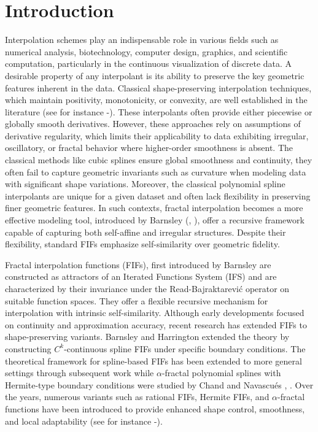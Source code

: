 \documentclass[runningheads]{llncs}
\begin{document}
	\section{Introduction}
	Interpolation schemes play an indispensable role in various fields such as numerical analysis, biotechnology, computer design, graphics, and scientific computation, particularly in the continuous visualization of discrete data. A desirable property of any interpolant is its ability to preserve the key geometric features inherent in the data. Classical shape-preserving interpolation techniques, which maintain positivity, monotonicity, or convexity, are well established in the literature (see for instance \cite{FT91}-\cite{HG1991}). These interpolants often provide either piecewise or globally smooth derivatives. However, these approaches rely on assumptions of derivative regularity, which limits their applicability to data exhibiting irregular, oscillatory, or fractal behavior where higher-order smoothness is absent. The classical methods like cubic splines ensure global smoothness and continuity, they often fail to capture geometric invariants such as curvature when modeling data with significant shape variations. Moreover, the classical polynomial spline interpolants are unique for a given dataset and often lack flexibility in preserving finer geometric features. In such contexts, fractal interpolation becomes a more effective modeling tool, introduced by Barnsley (\cite{Barnsley86}, \cite{Barnsley93}), offer a recursive framework capable of capturing both self-affine and irregular structures. Despite their flexibility, standard FIFs emphasize self-similarity over geometric fidelity.
	
	\par Fractal interpolation functions (FIFs), first introduced by Barnsley are constructed as attractors of an Iterated Functions System (IFS) and are characterized by their invariance under the Read-Bajraktarevi\'{c} operator on suitable function spaces. They offer a flexible recursive mechanism for interpolation with intrinsic self-similarity. Although early developments focused on continuity and approximation accuracy, recent research has extended FIFs to shape-preserving variants. Barnsley and Harrington \cite{BarHar89} extended the theory by constructing $C^k$-continuous spline FIFs under specific boundary conditions. The theoretical framework for spline-based FIFs has been extended to more general settings through subsequent work while $\alpha$-fractal polynomial splines with Hermite-type boundary conditions were studied by Chand and Navascu\'{e}s \cite{CN2009}, \cite{CVN2014}. Over the years, numerous variants such as rational FIFs, Hermite FIFs, and $\alpha$-fractal functions have been introduced to provide enhanced shape control, smoothness, and local adaptability (see for instance \cite{CV2015}-\cite{KC2018}). 
	
\end{document}
